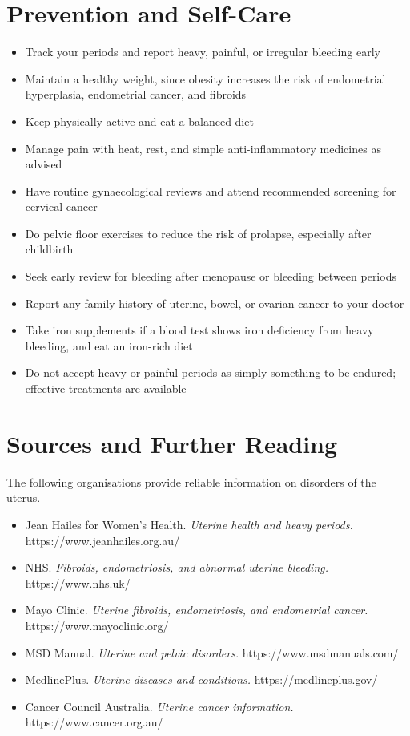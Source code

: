 \section*{Prevention and Self-Care}
\begin{itemize}
    \item Track your periods and report heavy, painful, or irregular bleeding early
    \item Maintain a healthy weight, since obesity increases the risk of endometrial hyperplasia, endometrial cancer, and fibroids
    \item Keep physically active and eat a balanced diet
    \item Manage pain with heat, rest, and simple anti-inflammatory medicines as advised
    \item Have routine gynaecological reviews and attend recommended screening for cervical cancer
    \item Do pelvic floor exercises to reduce the risk of prolapse, especially after childbirth
    \item Seek early review for bleeding after menopause or bleeding between periods
    \item Report any family history of uterine, bowel, or ovarian cancer to your doctor
    \item Take iron supplements if a blood test shows iron deficiency from heavy bleeding, and eat an iron-rich diet
    \item Do not accept heavy or painful periods as simply something to be endured; effective treatments are available
\end{itemize}

\section*{Sources and Further Reading}
The following organisations provide reliable information on disorders of the uterus.

\begin{itemize}
    \item Jean Hailes for Women's Health. \textit{Uterine health and heavy periods.} https://www.jeanhailes.org.au/
    \item NHS. \textit{Fibroids, endometriosis, and abnormal uterine bleeding.} https://www.nhs.uk/
    \item Mayo Clinic. \textit{Uterine fibroids, endometriosis, and endometrial cancer.} https://www.mayoclinic.org/
    \item MSD Manual. \textit{Uterine and pelvic disorders.} https://www.msdmanuals.com/
    \item MedlinePlus. \textit{Uterine diseases and conditions.} https://medlineplus.gov/
    \item Cancer Council Australia. \textit{Uterine cancer information.} https://www.cancer.org.au/
\end{itemize}
